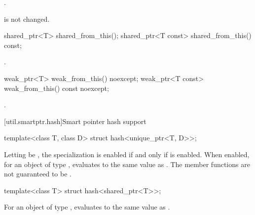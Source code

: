 \begin{itemdescr}
\pnum
\returns
{}.

\pnum
\begin{note}
 is not changed.
\end{note}
\end{itemdescr}

%
%
\begin{itemdecl}
shared_ptr<T>       shared_from_this();
shared_ptr<T const> shared_from_this() const;
\end{itemdecl}

\begin{itemdescr}
\pnum
\returns
{}.
\end{itemdescr}

%
%
\begin{itemdecl}
weak_ptr<T>       weak_from_this() noexcept;
weak_ptr<T const> weak_from_this() const noexcept;
\end{itemdecl}

\begin{itemdescr}
\pnum
\returns
{}.
\end{itemdescr}

[util.smartptr.hash]{Smart pointer hash support}

%
\begin{itemdecl}
template<class T, class D> struct hash<unique_ptr<T, D>>;
\end{itemdecl}

\begin{itemdescr}
\pnum
Letting  be ,
the specialization  is enabled
if and only if  is enabled.
When enabled, for an object  of type ,
 evaluates to
the same value as .
The member functions are not guaranteed to be .
\end{itemdescr}

%
\begin{itemdecl}
template<class T> struct hash<shared_ptr<T>>;
\end{itemdecl}

\begin{itemdescr}
\pnum
For an object  of type ,
 evaluates to
the same value as .
\end{itemdescr}%

